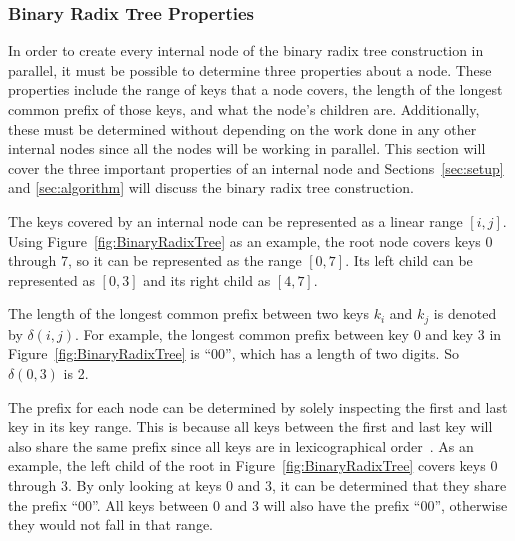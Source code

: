 \documentclass{sig-alternate}
\begin{document}
\subsubsection{Binary Radix Tree Properties}
\label{sec:brtProperties}

In order to create every internal node of the binary radix tree construction in parallel, it must be possible to determine three properties about a node. These properties include the range of keys that a node covers, the length of the longest common prefix of those keys, and what the node's children are. Additionally, these must be determined without depending on the work done in any other internal nodes since all the nodes will be working in parallel. This section will cover the three important properties of an internal node and Sections~\ref{sec:setup} and \ref{sec:algorithm} will discuss the binary radix tree construction.

The keys covered by an internal node can be represented as a linear range $[i,j]$. Using Figure~\ref{fig:BinaryRadixTree} as an example, the root node covers keys 0 through 7, so it can be represented as the range $[0,7]$. Its left child can be represented as $[0,3]$ and its right child as $[4,7]$.

The length of the longest common prefix between two keys $k_{i}$ and $k_{j}$ is denoted by $\delta(i,j)$. For example, the longest common prefix between key 0 and key 3 in Figure~\ref{fig:BinaryRadixTree} is ``00'', which has a length of two digits. So $\delta(0,3)$ is 2.

The prefix for each node can be determined by solely inspecting the first and last key in its key range. This is because all keys between the first and last key will also share the same prefix since all keys are in lexicographical order~\cite{Karras:2012}. As an example, the left child of the root in Figure~\ref{fig:BinaryRadixTree} covers keys 0 through 3. By only looking at keys 0 and 3, it can be determined that they share the prefix ``00''. All keys between 0 and 3 will also have the prefix ``00'', otherwise they would not fall in that range.
\end{document}
